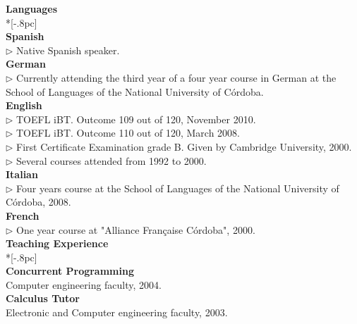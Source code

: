 \documentclass[letter,11pt,english]{article}
\begin{document}
{\large \bf Languages} \\*[-.8pc]
\underline{\hspace{6in}} \\
{\bf Spanish}\\
$\triangleright$ Native Spanish speaker.
\\
{\bf German}\\
$\triangleright$ Currently attending the third year of a four year course in German 
at the School of Languages of the National University of C\'ordoba.
 \\
{
{\bf English}\\
$\triangleright$ TOEFL iBT. Outcome 109 out of 120, November 2010.\\
$\triangleright$ TOEFL iBT. Outcome 110 out of 120, March 2008.\\
$\triangleright$ First Certificate Examination grade B. Given by Cambridge University, 2000.\\
$\triangleright$ Several courses attended from 1992 to 2000.\\
{\bf Italian}\\
$\triangleright$ Four years course at the School of Languages of the National University of C\'ordoba, 2008.
\\
{\bf French}\\
$\triangleright$ One year course at "Alliance Fran\c caise C\'ordoba", 2000.
\\

{\large \bf Teaching Experience} \\*[-.8pc]
\underline{\hspace{6in}} \\
{\bf Concurrent Programming}\\
Computer engineering faculty, 2004.
\\
{\bf Calculus Tutor}\\
Electronic and Computer engineering faculty, 2003.
\\

}
\end{document}
